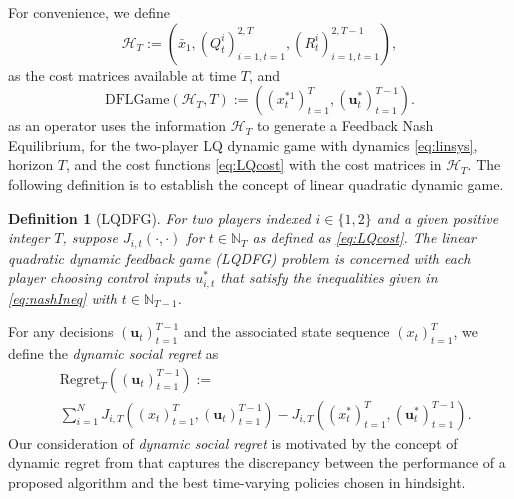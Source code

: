 \documentclass[letterpaper, 10 pt, conference]{ieeeconf}  %
\newtheorem{definition}{Definition}
\begin{document}
For convenience, we define 
\begin{equation}\label{eq:history}
    \mathcal{H}_{T} := ( \bar{x}_{1},(Q_{t}^{i})_{i=1,t=1}^{2,T},(R_{t}^{i})_{i=1,t=1}^{2,T-1}),
\end{equation}
as the cost matrices available at time $T$, and
\begin{equation}\label{eq:regret}
 \text{DFLGame}(\mathcal{H}_{T},T):=((x_{t}^{*1})_{t=1}^{T}, (\mathbf{u}_{t}^{*})_{t=1}^{T-1}).
\end{equation}
as an operator uses the information $\mathcal{H}_{T}$ to generate a Feedback Nash Equilibrium, for the two-player LQ dynamic game with dynamics \eqref{eq:linsys}, horizon $T$, and the cost functions \eqref{eq:LQcost} with the cost matrices in $\mathcal{H}_{T}$. The following definition is to establish the concept of linear quadratic dynamic game.

\begin{definition}[LQDFG]\label{def:LQDFG}
     For two players indexed $i\in\{1,2\}$ and a given positive integer $T$, suppose $J_{i,t}(\cdot,\cdot)$ for $t\in\mathbb{N}_{T}$ as defined as \eqref{eq:LQcost}. The linear quadratic dynamic feedback game (LQDFG) problem is concerned with each player choosing control inputs $u_{i,t}^{*}$ that satisfy the inequalities given in \eqref{eq:nashIneq} with $t \in \mathbb{N}_{T-1}$. 
\end{definition}

For any decisions $(\mathbf{u}_{t})_{t=1}^{T-1}$ and the associated state sequence $(x_{t})_{t=1}^{T}$, we define the \emph{dynamic social regret} as
\begin{equation*}
    \begin{split}
        &\text{Regret}_{T}((\mathbf{u}_{t})_{t=1}^{T-1}) := \\
        &\sum_{i=1}^{N} J_{i,T}((x_{t})_{t=1}^{T},(\mathbf{u}_{t})_{t=1}^{T-1}) - J_{i,T}((x_{t}^{*})_{t=1}^{T},(\mathbf{u}_{t}^{*})_{t=1}^{T-1}).
    \end{split}
\end{equation*}
Our consideration of \emph{dynamic social regret} is motivated by the concept of dynamic regret from \cite[Equation (5)]{chen_regret_2023} that captures the discrepancy between the performance of a proposed algorithm and the best time-varying policies chosen in hindsight.
\end{document}
